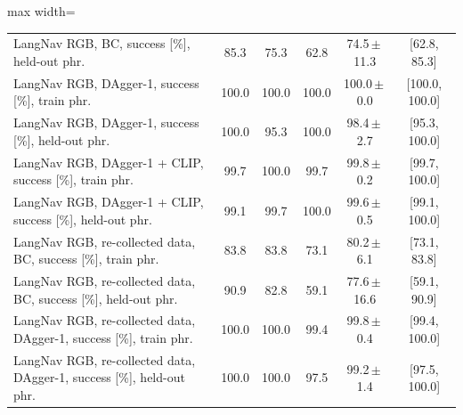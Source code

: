 \begin{table}[!htbp]
\begin{adjustbox}{max width=\linewidth}
\begin{tabular}{lccccc}
LangNav RGB, BC, success [\%], held-out phr. & 85.3 & 75.3 & 62.8 & 74.5\,$\pm$\,11.3 & [62.8, 85.3]\\
LangNav RGB, DAgger-1, success [\%], train phr. & 100.0 & 100.0 & 100.0 & 100.0\,$\pm$\,0.0 & [100.0, 100.0]\\
LangNav RGB, DAgger-1, success [\%], held-out phr. & 100.0 & 95.3 & 100.0 & 98.4\,$\pm$\,2.7 & [95.3, 100.0]\\
LangNav RGB, DAgger-1 + CLIP, success [\%], train phr. & 99.7 & 100.0 & 99.7 & 99.8\,$\pm$\,0.2 & [99.7, 100.0]\\
LangNav RGB, DAgger-1 + CLIP, success [\%], held-out phr. & 99.1 & 99.7 & 100.0 & 99.6\,$\pm$\,0.5 & [99.1, 100.0]\\
LangNav RGB, re-collected data, BC, success [\%], train phr. & 83.8 & 83.8 & 73.1 & 80.2\,$\pm$\,6.1 & [73.1, 83.8]\\
LangNav RGB, re-collected data, BC, success [\%], held-out phr. & 90.9 & 82.8 & 59.1 & 77.6\,$\pm$\,16.6 & [59.1, 90.9]\\
LangNav RGB, re-collected data, DAgger-1, success [\%], train phr. & 100.0 & 100.0 & 99.4 & 99.8\,$\pm$\,0.4 & [99.4, 100.0]\\
LangNav RGB, re-collected data, DAgger-1, success [\%], held-out phr. & 100.0 & 100.0 & 97.5 & 99.2\,$\pm$\,1.4 & [97.5, 100.0]\\
\bottomrule\end{tabular}\end{adjustbox}
\end{table}

